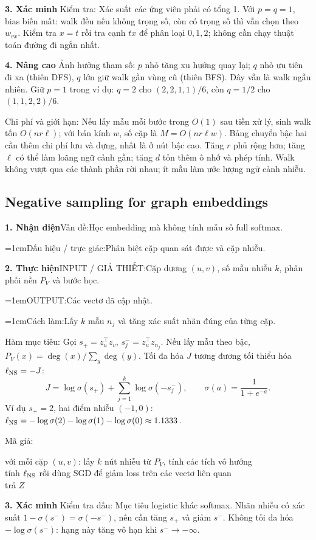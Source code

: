 \documentclass[10pt,a4paper,twocolumn]{article}
\makeatletter
\newif\ifexamheadingprinted
\newcommand{\topic}[2]{%
  \global\examheadingprintedfalse\par\subsection{#2}\label{topic:#1}}
\newcommand{\key}[1]{#1:\enspace}
\newcommand{\algfield}[2]{\par\noindent\hangindent=1em\relax#1:\enspace#2}
\newcommand{\unitheading}[2]{%
  \par\addvspace{1pt}\noindent\textbf{#1. #2}\enspace}
\newcommand{\unitverification}{\unitheading{3}{Xác minh}}
\newcommand{\unitadvanced}{\unitheading{4}{Nâng cao}}
\newcommand{\unitfield}[4]{%
  \par\noindent\textbf{#1. #2}\enspace #3:\enspace #4}
\newcommand{\algsummary}[6]{%
  \begingroup\setlength{\parskip}{1pt}%
  \unitfield{1}{Nhận diện}{Vấn đề}{#1}%
  \algfield{Dấu hiệu / trực giác}{#2}%
  \if\relax\detokenize{#3}\relax\else\par\noindent#3\par\fi%
  \unitfield{2}{Thực hiện}{INPUT / GIẢ THIẾT}{#4}%
  \algfield{OUTPUT}{#5}%
  \algfield{Cách làm}{#6}\par\endgroup}
\newenvironment{algpseudo}{%
  \par\addvspace{2pt}\noindent
  \setlength{\parskip}{0pt}%
  Mã giả:\par\nobreak
  \begin{list}{}{\setlength{\leftmargin}{1em}\setlength{\topsep}{0pt}%
    \setlength{\partopsep}{0pt}\setlength{\parsep}{0pt}%
    \@beginparpenalty=10000\relax}%
  \item\relax
}{\end{list}\par\addvspace{3pt}}
\makeatother
\begin{document}
\unitverification
\key{Kiểm tra} Xác suất các ứng viên phải có tổng 1. Với $p=q=1$, bias biến mất: walk đều nếu không trọng số, còn có trọng số thì vẫn chọn theo $w_{vx}$. Kiểm tra $x=t$ rồi tra cạnh $tx$ để phân loại $0,1,2$; không cần chạy thuật toán đường đi ngắn nhất.

\unitadvanced
\key{Ảnh hưởng tham số} $p$ nhỏ tăng xu hướng quay lại; $q$ nhỏ ưu tiên đi xa (thiên DFS), $q$ lớn giữ walk gần vùng cũ (thiên BFS). Đây vẫn là walk ngẫu nhiên. Giữ $p=1$ trong ví dụ: $q=2$ cho $(2,2,1,1)/6$, còn $q=1/2$ cho $(1,1,2,2)/6$.

\key{Chi phí và giới hạn} Nếu lấy mẫu mỗi bước trong $O(1)$ sau tiền xử lý, sinh walk tốn $O(nr\ell)$; với bán kính $w$, số cặp là $M=O(nr\ell w)$. Bảng chuyển bậc hai cần thêm chi phí lưu và dựng, nhất là ở nút bậc cao. Tăng $r$ phủ rộng hơn; tăng $\ell$ có thể làm loãng ngữ cảnh gần; tăng $d$ tốn thêm ô nhớ và phép tính. Walk không vượt qua các thành phần rời nhau; ít mẫu làm ước lượng ngữ cảnh nhiễu.

\topic{negatives}{Negative sampling for graph embeddings}

\algsummary{Học embedding mà không tính mẫu số full softmax.}{Phân biệt cặp quan sát được và cặp nhiễu.}{}{Cặp dương $(u,v)$, số mẫu nhiễu $k$, phân phối nền $P_V$ và bước học.}{Các vectơ đã cập nhật.}{Lấy $k$ mẫu $n_j$ và tăng xác suất nhãn đúng của từng cặp.}

\key{Hàm mục tiêu} Gọi $s_+=z_u^\top z_v$, $s_j^-=z_u^\top z_{n_j}$. Nếu lấy mẫu theo bậc, $P_V(x)=\deg(x)/\sum_y\deg(y)$. Tối đa hóa $J$ tương đương tối thiểu hóa $\ell_{\rm NS}=-J$:
\[
J=\log\sigma(s_+)+\sum_{j=1}^k\log\sigma(-s_j^-),
\qquad \sigma(a)=\frac{1}{1+e^{-a}}.
\]
Ví dụ $s_+=2$, hai điểm nhiễu $(-1,0)$: $\ell_{\rm NS}=-\log\sigma(2)-\log\sigma(1)-\log\sigma(0)\approx1.1333$.

\begin{algpseudo}
với mỗi cặp $(u,v)$: lấy $k$ nút nhiễu từ $P_V$, tính các tích vô hướng\\
\quad tính $\ell_{\rm NS}$ rồi dùng SGD để giảm loss trên các vectơ liên quan\\
trả $Z$
\end{algpseudo}

\unitverification
\key{Kiểm tra dấu} Mục tiêu logistic khác softmax. Nhãn nhiễu có xác suất $1-\sigma(s^-)=\sigma(-s^-)$, nên cần tăng $s_+$ và giảm $s^-$. Không tối đa hóa $-\log\sigma(s^-)$: hạng này tăng vô hạn khi $s^-\to-\infty$.
\end{document}
